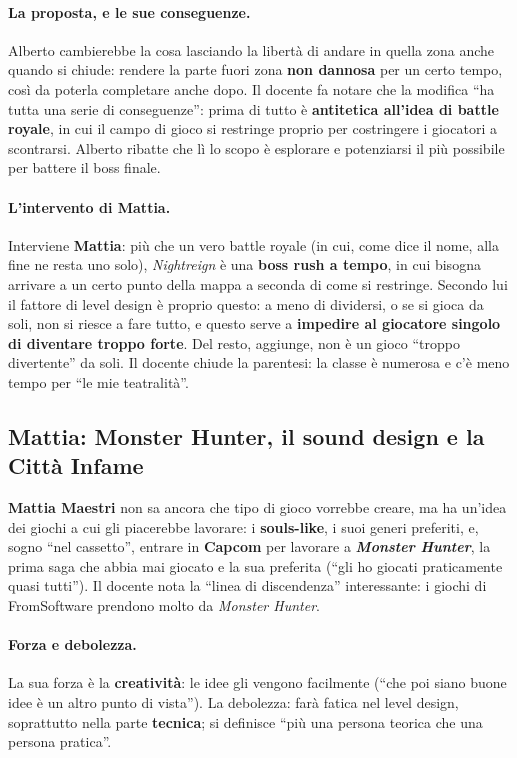 \paragraph{La proposta, e le sue conseguenze.} Alberto cambierebbe la cosa
lasciando la libertà di andare in quella zona anche quando si chiude: rendere
la parte fuori zona \textbf{non dannosa} per un certo tempo, così da poterla
completare anche dopo. Il docente fa notare che la modifica ``ha tutta una
serie di conseguenze'': prima di tutto è \textbf{antitetica all'idea di battle
royale}, in cui il campo di gioco si restringe proprio per costringere i
giocatori a scontrarsi. Alberto ribatte che lì lo scopo è esplorare e
potenziarsi il più possibile per battere il boss finale.

\paragraph{L'intervento di Mattia.} Interviene \textbf{Mattia}: più che un
vero battle royale (in cui, come dice il nome, alla fine ne resta uno solo),
\emph{Nightreign} è una \textbf{boss rush a tempo}, in cui bisogna arrivare a
un certo punto della mappa a seconda di come si restringe. Secondo lui il
fattore di level design è proprio questo: a meno di dividersi, o se si gioca
da soli, non si riesce a fare tutto, e questo serve a \textbf{impedire al
giocatore singolo di diventare troppo forte}. Del resto, aggiunge, non è un
gioco ``troppo divertente'' da soli. Il docente chiude la parentesi: la classe
è numerosa e c'è meno tempo per ``le mie teatralità''.

\subsection{Mattia: Monster Hunter, il sound design e la Città Infame}

\textbf{Mattia Maestri} non sa ancora che tipo di gioco vorrebbe creare, ma ha
un'idea dei giochi a cui gli piacerebbe lavorare: i \textbf{souls-like}, i
suoi generi preferiti, e, sogno ``nel cassetto'', entrare in
\textbf{Capcom} per lavorare a \textbf{\emph{Monster Hunter}}, la prima saga
che abbia mai giocato e la sua preferita (``gli ho giocati praticamente quasi
tutti''). Il docente nota la ``linea di discendenza'' interessante: i giochi di
FromSoftware prendono molto da \emph{Monster Hunter}.

\paragraph{Forza e debolezza.} La sua forza è la \textbf{creatività}: le idee
gli vengono facilmente (``che poi siano buone idee è un altro punto di
vista''). La debolezza: farà fatica nel level design, soprattutto nella parte
\textbf{tecnica}; si definisce ``più una persona teorica che una persona
pratica''.

